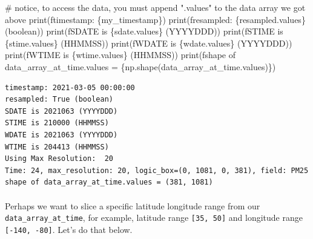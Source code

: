 \documentclass[
  letterpaper,
  DIV=11,
  numbers=noendperiod]{scrreprt}
\makeatletter
\let\oldparagraph\paragraph
\renewcommand{\paragraph}{
    \@ifstar
      \xxxParagraphStar
      \xxxParagraphNoStar
  }
\newcommand{\xxxParagraphStar}[1]{\oldparagraph*{#1}\mbox{}}
\newcommand{\xxxParagraphNoStar}[1]{\oldparagraph{#1}\mbox{}}
\newenvironment{Shaded}{\begin{snugshade}}{\end{snugshade}}
\newcommand{\BuiltInTok}[1]{\textcolor[rgb]{0.00,0.23,0.31}{#1}}
\newcommand{\CommentTok}[1]{\textcolor[rgb]{0.37,0.37,0.37}{#1}}
\newcommand{\NormalTok}[1]{\textcolor[rgb]{0.00,0.23,0.31}{#1}}
\newcommand{\SpecialCharTok}[1]{\textcolor[rgb]{0.37,0.37,0.37}{#1}}
\newcommand{\SpecialStringTok}[1]{\textcolor[rgb]{0.13,0.47,0.30}{#1}}
\makeatother
\begin{document}
\begin{Shaded}
\begin{Highlighting}[]
\CommentTok{\# notice, to access the data, you must append ".values" to the data array we got above}
\BuiltInTok{print}\NormalTok{(}\SpecialStringTok{f\textquotesingle{}timestamp: }\SpecialCharTok{\{}\NormalTok{my\_timestamp}\SpecialCharTok{\}}\SpecialStringTok{\textquotesingle{}}\NormalTok{)}
\BuiltInTok{print}\NormalTok{(}\SpecialStringTok{f\textquotesingle{}resampled: }\SpecialCharTok{\{}\NormalTok{resampled}\SpecialCharTok{.}\NormalTok{values}\SpecialCharTok{\}}\SpecialStringTok{ (boolean)\textquotesingle{}}\NormalTok{)}
\BuiltInTok{print}\NormalTok{(}\SpecialStringTok{f\textquotesingle{}SDATE is }\SpecialCharTok{\{}\NormalTok{sdate}\SpecialCharTok{.}\NormalTok{values}\SpecialCharTok{\}}\SpecialStringTok{ (YYYYDDD)\textquotesingle{}}\NormalTok{)}
\BuiltInTok{print}\NormalTok{(}\SpecialStringTok{f\textquotesingle{}STIME is }\SpecialCharTok{\{}\NormalTok{stime}\SpecialCharTok{.}\NormalTok{values}\SpecialCharTok{\}}\SpecialStringTok{ (HHMMSS)\textquotesingle{}}\NormalTok{)}
\BuiltInTok{print}\NormalTok{(}\SpecialStringTok{f\textquotesingle{}WDATE is }\SpecialCharTok{\{}\NormalTok{wdate}\SpecialCharTok{.}\NormalTok{values}\SpecialCharTok{\}}\SpecialStringTok{ (YYYYDDD)\textquotesingle{}}\NormalTok{)}
\BuiltInTok{print}\NormalTok{(}\SpecialStringTok{f\textquotesingle{}WTIME is }\SpecialCharTok{\{}\NormalTok{wtime}\SpecialCharTok{.}\NormalTok{values}\SpecialCharTok{\}}\SpecialStringTok{ (HHMMSS)\textquotesingle{}}\NormalTok{)}
\BuiltInTok{print}\NormalTok{(}\SpecialStringTok{f\textquotesingle{}shape of data\_array\_at\_time.values = }\SpecialCharTok{\{}\NormalTok{np}\SpecialCharTok{.}\NormalTok{shape(data\_array\_at\_time.values)}\SpecialCharTok{\}}\SpecialStringTok{\textquotesingle{}}\NormalTok{)}
\end{Highlighting}
\end{Shaded}

\begin{verbatim}
timestamp: 2021-03-05 00:00:00
resampled: True (boolean)
SDATE is 2021063 (YYYYDDD)
STIME is 210000 (HHMMSS)
WDATE is 2021063 (YYYYDDD)
WTIME is 204413 (HHMMSS)
Using Max Resolution:  20
Time: 24, max_resolution: 20, logic_box=(0, 1081, 0, 381), field: PM25
shape of data_array_at_time.values = (381, 1081)
\end{verbatim}

\paragraph{\texorpdfstring{Perhaps we want to slice a specific latitude
longitude range from our \texttt{data\_array\_at\_time}, for example,
latitude range \texttt{{[}35,\ 50{]}} and longitude range
\texttt{{[}-140,\ -80{]}}. Let's do that
below.}{Perhaps we want to slice a specific latitude longitude range from our data\_array\_at\_time, for example, latitude range {[}35, 50{]} and longitude range {[}-140, -80{]}. Let's do that below.}}\label{perhaps-we-want-to-slice-a-specific-latitude-longitude-range-from-our-data_array_at_time-for-example-latitude-range-35-50-and-longitude-range--140--80.-lets-do-that-below.}
\end{document}
